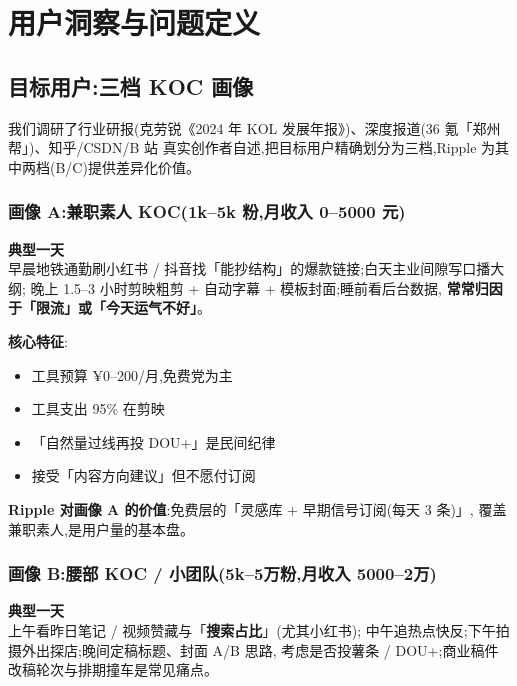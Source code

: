\section{用户洞察与问题定义}

\subsection{目标用户:三档 KOC 画像}

我们调研了行业研报(克劳锐《2024 年 KOL 发展年报》)、深度报道(36 氪「郑州帮」)、知乎/CSDN/B 站
真实创作者自述,把目标用户精确划分为三档,Ripple 为其中两档(B/C)提供差异化价值。

\subsubsection{画像 A:兼职素人 KOC(1k--5k 粉,月收入 0--5000 元)}

\begin{quote-box}
\textbf{典型一天}\\
早晨地铁通勤刷小红书 / 抖音找「能抄结构」的爆款链接;白天主业间隙写口播大纲;
晚上 1.5--3 小时剪映粗剪 + 自动字幕 + 模板封面;睡前看后台数据,
\textbf{常常归因于「限流」或「今天运气不好」}。
\end{quote-box}

\textbf{核心特征}:
\begin{itemize}
\item 工具预算 ¥0--200/月,免费党为主
\item 工具支出 95\% 在剪映
\item 「自然量过线再投 DOU+」是民间纪律
\item 接受「内容方向建议」但不愿付订阅
\end{itemize}

\textbf{Ripple 对画像 A 的价值}:免费层的「灵感库 + 早期信号订阅(每天 3 条)」,
覆盖兼职素人,是用户量的基本盘。

\subsubsection{画像 B:腰部 KOC / 小团队(5k--5万粉,月收入 5000--2万)}

\begin{quote-box}
\textbf{典型一天}\\
上午看昨日笔记 / 视频赞藏与「\textbf{搜索占比}」(尤其小红书);
中午追热点快反;下午拍摄外出探店;晚间定稿标题、封面 A/B 思路,
考虑是否投薯条 / DOU+;商业稿件改稿轮次与排期撞车是常见痛点。
\end{quote-box}

